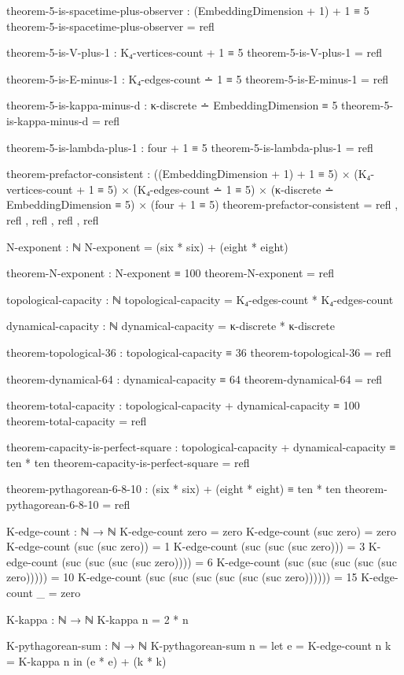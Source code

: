 \documentclass[11pt,a4paper]{book}
\begin{document}
\begin{code}
theorem-5-is-spacetime-plus-observer : (EmbeddingDimension + 1) + 1 ≡ 5
theorem-5-is-spacetime-plus-observer = refl

theorem-5-is-V-plus-1 : K₄-vertices-count + 1 ≡ 5
theorem-5-is-V-plus-1 = refl

theorem-5-is-E-minus-1 : K₄-edges-count ∸ 1 ≡ 5
theorem-5-is-E-minus-1 = refl

theorem-5-is-kappa-minus-d : κ-discrete ∸ EmbeddingDimension ≡ 5
theorem-5-is-kappa-minus-d = refl

theorem-5-is-lambda-plus-1 : four + 1 ≡ 5
theorem-5-is-lambda-plus-1 = refl

theorem-prefactor-consistent : 
  ((EmbeddingDimension + 1) + 1 ≡ 5) ×
  (K₄-vertices-count + 1 ≡ 5) ×
  (K₄-edges-count ∸ 1 ≡ 5) ×
  (κ-discrete ∸ EmbeddingDimension ≡ 5) ×
  (four + 1 ≡ 5)
theorem-prefactor-consistent = refl , refl , refl , refl , refl

N-exponent : ℕ
N-exponent = (six * six) + (eight * eight)

theorem-N-exponent : N-exponent ≡ 100
theorem-N-exponent = refl

topological-capacity : ℕ
topological-capacity = K₄-edges-count * K₄-edges-count

dynamical-capacity : ℕ
dynamical-capacity = κ-discrete * κ-discrete

theorem-topological-36 : topological-capacity ≡ 36
theorem-topological-36 = refl

theorem-dynamical-64 : dynamical-capacity ≡ 64
theorem-dynamical-64 = refl

theorem-total-capacity : topological-capacity + dynamical-capacity ≡ 100
theorem-total-capacity = refl

theorem-capacity-is-perfect-square : topological-capacity + dynamical-capacity ≡ ten * ten
theorem-capacity-is-perfect-square = refl

theorem-pythagorean-6-8-10 : (six * six) + (eight * eight) ≡ ten * ten
theorem-pythagorean-6-8-10 = refl

K-edge-count : ℕ → ℕ
K-edge-count zero = zero
K-edge-count (suc zero) = zero
K-edge-count (suc (suc zero)) = 1
K-edge-count (suc (suc (suc zero))) = 3
K-edge-count (suc (suc (suc (suc zero)))) = 6
K-edge-count (suc (suc (suc (suc (suc zero))))) = 10
K-edge-count (suc (suc (suc (suc (suc (suc zero)))))) = 15
K-edge-count _ = zero

K-kappa : ℕ → ℕ
K-kappa n = 2 * n

K-pythagorean-sum : ℕ → ℕ
K-pythagorean-sum n = let e = K-edge-count n
                          k = K-kappa n
                      in (e * e) + (k * k)


\end{code}
\end{document}
